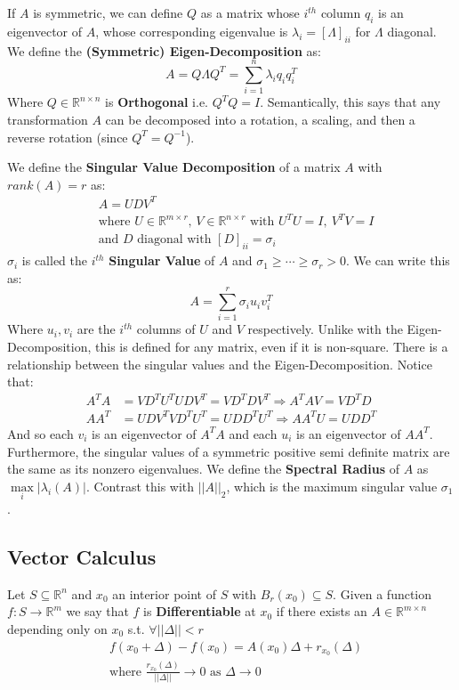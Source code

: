 \documentclass[]{article}
\theoremstyle{mattstyle}
\theoremstyle{definition}
\begin{document}
If $A$ is symmetric, we can define $Q$ as a matrix whose $i^{th}$ column $q_i$ is an eigenvector of $A$, whose corresponding eigenvalue is $\lambda_i = [\Lambda]_{ii}$ for $\Lambda$ diagonal. We define the \textbf{(Symmetric) Eigen-Decomposition} as:
$$A = Q\Lambda Q^T = \sum_{i=1}^n \lambda_i q_i q_i^T$$
Where $Q\in\mathbb{R}^{n \times n}$ is \textbf{Orthogonal} i.e. $Q^TQ=I$. Semantically, this says that any transformation $A$ can be decomposed into a rotation, a scaling, and then a reverse rotation (since $Q^T=Q^{-1}$).

\newpage

We define the \textbf{Singular Value Decomposition} of a matrix $A$ with $rank(A)=r$ as:
\begin{align*}
&A=UDV^T\\
&\text{where $U\in\mathbb{R}^{m \times r}$, $V\in\mathbb{R}^{n \times r}$ with } U^TU=I, \ V^TV=I\\
&\text{and $D$ diagonal with $[D]_{ii}=\sigma_i$}
\end{align*}
$\sigma_i$ is called the $i^{th}$ \textbf{Singular Value} of $A$ and $\sigma_1 \ge \cdots \ge \sigma_r > 0$. We can write this as:
$$A = \sum_{i=1}^r \sigma_i u_iv_i^T$$
Where $u_i, v_i$ are the $i^{th}$ columns of $U$ and $V$ respectively. 
Unlike with the Eigen-Decomposition, this is defined for any matrix, even if it is non-square. There is a relationship between the singular values and the Eigen-Decomposition. Notice that:
\begin{align*}
A^TA &= VD^TU^TUDV^T=VD^TDV^T \Rightarrow A^TAV = VD^TD\\
AA^T &= UDV^TVD^TU^T=UDD^TU^T \Rightarrow AA^TU = UDD^T
\end{align*}
And so each $v_i$ is an eigenvector of $A^TA$ and each $u_i$ is an eigenvector of $AA^T$. Furthermore, the singular values of a symmetric positive semi definite matrix are the same as its nonzero eigenvalues. We define the \textbf{Spectral Radius} of $A$ as $\max\limits_{i} |\lambda_i(A)|$. Contrast this with $||A||_2$, which is the maximum singular value $\sigma_1$.

\newpage

\subsection{Vector Calculus}

Let $S \subseteq \mathbb{R}^n$ and $x_0$ an interior point of $S$ with $B_r(x_0) \subseteq S$. Given a function $f: S \rightarrow \mathbb{R}^m$ we say that $f$ is \textbf{Differentiable} at $x_0$ if there exists an $A \in \mathbb{R}^{m \times n}$ depending only on $x_0$ s.t. $\forall ||\Delta|| < r$
\begin{align*}
&f(x_0 + \Delta) - f(x_0) = A(x_0)\Delta + r_{x_0}(\Delta)\\
&\text{where $\frac{r_{x_0}(\Delta)}{||\Delta||}\rightarrow 0$ as $\Delta \rightarrow 0$}
\end{align*}
\end{document}
